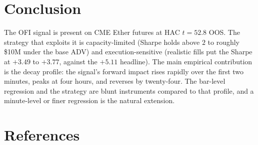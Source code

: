﻿\documentclass[11pt,a4paper]{article}
\begin{document}
\section{Conclusion}

The OFI signal is present on CME Ether futures at HAC $t = 52.8$ OOS. The strategy that exploits it is capacity-limited (Sharpe holds above $2$ to roughly \$10M under the base ADV) and execution-sensitive (realistic fills put the Sharpe at $+3.49$ to $+3.77$, against the $+5.11$ headline). The main empirical contribution is the decay profile: the signal's forward impact rises rapidly over the first two minutes, peaks at four hours, and reverses by twenty-four. The bar-level regression and the strategy are blunt instruments compared to that profile, and a minute-level or finer regression is the natural extension.

\section*{References}
\end{document}
